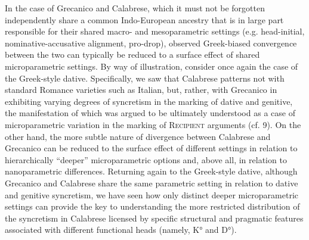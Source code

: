 \documentclass[12pt]{article}
\newenvironment{styleStandard}{\setlength\leftskip{0cm}\setlength\rightskip{0cm plus 1fil}\setlength\parindent{0cm}\setlength\parfillskip{0pt plus 1fil}\setlength\parskip{0cm plus 1pt}\writerlistparindent\writerlistleftskip\leavevmode\normalfont\normalsize\writerlistlabel\ignorespaces}{\unskip\vspace{0cm plus 1pt}\par}
\newcommand\writerlistleftskip{}
\newcommand\writerlistparindent{}
\newcommand\writerlistlabel{}
\begin{document}
\begin{styleStandard}
In the case of Grecanico and Calabrese, which it must not be forgotten independently share a common Indo-European ancestry that is in large part responsible for their shared macro- and mesoparametric settings (e.g. head-initial, nominative-accusative alignment, pro-drop), observed Greek-biased convergence between the two can typically be reduced to a surface effect of shared microparametric settings. By way of illustration, consider once again the case of the Greek-style dative. Specifically, we saw that Calabrese patterns not with standard Romance varieties such as Italian, but, rather, with Grecanico in exhibiting varying degrees of syncretism in the marking of dative and genitive, the manifestation of which was argued to be ultimately understood as a case of microparametric variation in the marking of \textsc{Recipient} arguments (cf. 9). On the other hand, the more subtle nature of divergence between Calabrese and Grecanico can be reduced to the surface effect of different settings in relation to hierarchically “deeper” microparametric options and, above all, in relation to nanoparametric differences. Returning again to the Greek-style dative, although Grecanico and Calabrese share the same parametric setting in relation to dative and genitive syncretism, we have seen how only distinct deeper microparametric settings can provide the key to understanding the more restricted distribution of the syncretism in Calabrese licensed by specific structural and pragmatic features associated with different functional heads (namely, K° and D°).
\end{styleStandard}
\end{document}
